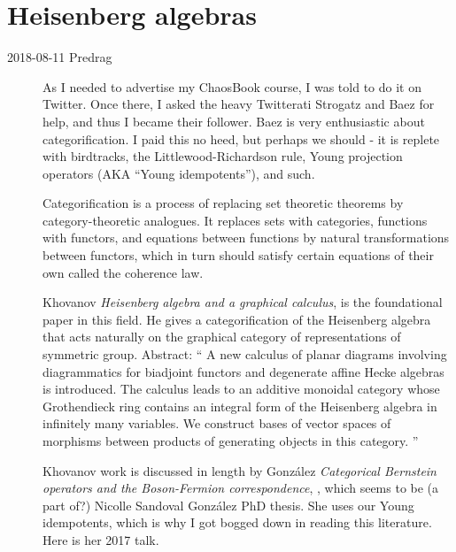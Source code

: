 \newpage
\section{Heisenberg algebras}
\label{s-Heisenberg}

\begin{description}

\item[2018-08-11 Predrag]
As I needed to advertise my
 {ChaosBook} course, I was
told to do it on Twitter. Once there, I asked the heavy Twitterati
Strogatz and  {Baez} for help,
and thus I became their follower. Baez is very enthusiastic about
categorification. I paid this no heed, but perhaps we should - it is
replete with birdtracks, the Littlewood-Richardson rule, Young projection
operators (AKA ``Young idempotents''), and such.

Categorification is a process of replacing set theoretic
theorems by category-theoretic analogues. It replaces sets with
categories, functions with functors, and equations between functions by
natural transformations between functors, which in turn should satisfy
certain equations of their own called the coherence law.

Khovanov {\em Heisenberg algebra and a graphical calculus},
 is the foundational paper in this field.
He gives a categorification of the Heisenberg algebra that acts naturally
on the graphical category of representations  of  symmetric  group.
Abstract: ``
A new calculus of planar diagrams involving diagrammatics for biadjoint
functors and degenerate affine Hecke algebras is introduced. The calculus
leads to an additive monoidal category whose Grothendieck ring contains
an integral form of the Heisenberg algebra in infinitely many variables.
We construct bases of vector spaces of morphisms between products of
generating objects in this category.
''

Khovanov work is discussed in length by
Gonz{\'a}lez {\em Categorical {Bernstein} operators and the
{Boson-Fermion} correspondence}, ,
which seems to be (a part of?)
{Nicolle Sandoval Gonz{\'a}lez} PhD thesis. She uses our Young idempotents,
which is why I got bogged down in reading this literature. Here is her
 {2017 talk}.


\end{description}

